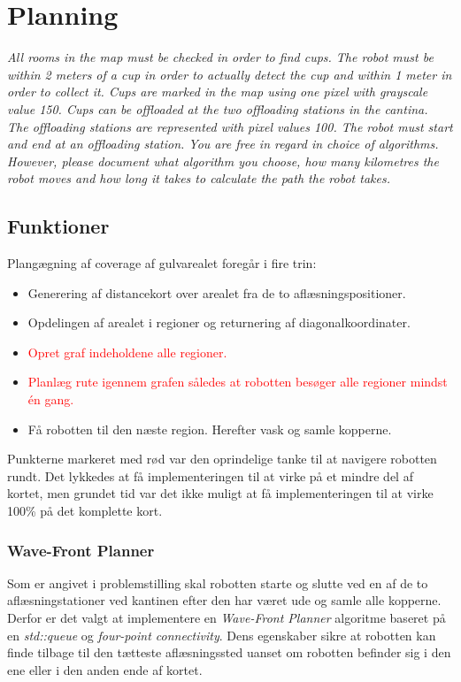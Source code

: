 \section{Planning}
\label{sec:plan}
\textit{All rooms in the map must be checked in order to find cups. The robot must be within 2 meters of a cup in order to actually detect the cup and within 1 meter in order to collect it. Cups are marked in the map using one pixel with grayscale value 150. Cups can be offloaded at the two offloading stations in the cantina. The offloading stations are represented with pixel values 100. The robot must start and end at an offloading station.
You are free in regard in choice of algorithms. However, please document what algorithm you choose, how many kilometres the robot moves and how long it takes to calculate the path the robot takes.}

\subsection{Funktioner}
Plangægning af coverage af gulvarealet foregår i fire trin:
\begin{itemize}
	\item Generering af distancekort over arealet fra de to aflæsningspositioner.
	\item Opdelingen af arealet i regioner og returnering af diagonalkoordinater.
	\item \textcolor{red}{Opret graf indeholdene alle regioner.}
	\item \textcolor{red}{Planlæg rute igennem grafen således at robotten besøger alle regioner mindst én gang.}
	\item Få robotten til den næste region. Herefter vask og samle kopperne.
\end{itemize}

Punkterne markeret med rød var den oprindelige tanke til at navigere robotten rundt. Det lykkedes at få implementeringen til at virke på et mindre del af kortet, men grundet tid var det ikke muligt at få implementeringen til at virke 100\% på det komplette kort.

\subsubsection{Wave-Front Planner}
Som er angivet i problemstilling skal robotten starte og slutte ved en af de to aflæsningstationer ved kantinen efter den har været ude og samle alle kopperne. Derfor er det valgt at implementere en \emph{Wave-Front Planner} algoritme baseret på en \emph{std::queue} og \emph{four-point connectivity}. 
Dens egenskaber sikre at robotten kan finde tilbage til den tætteste aflæsningssted uanset om robotten befinder sig i den ene eller i den anden ende af kortet. \\

